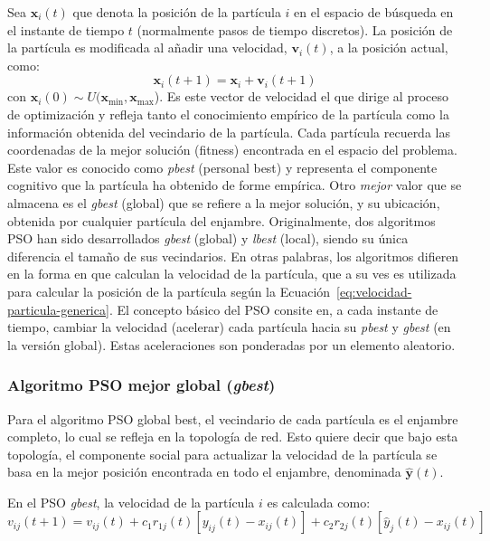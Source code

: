 \documentclass{article}
\begin{document}
Sea $\mathbf{x}_i(t)$ que denota la posición de la partícula $i$ en el espacio de búsqueda en el instante de tiempo $t$ (normalmente pasos de tiempo discretos).
La posición de la partícula es modificada al añadir una velocidad, $\mathbf{v}_i(t)$, a la posición actual, como:
\begin{equation}
	\mathbf{x}_i(t+1) = \mathbf{x}_i + \mathbf{v}_i(t+1)
	\label{eq:velocidad-particula-generica}
\end{equation}
con $\mathbf{x}_i(0) \sim U(\mathbf{x}_\text{min},\mathbf{x}_\text{max}$).
Es este vector de velocidad el que dirige al proceso de optimización y refleja tanto el conocimiento empírico de la partícula como la información obtenida del vecindario de la partícula.
Cada partícula recuerda las coordenadas de la mejor solución (fitness) encontrada en el espacio del problema. 
Este valor es conocido como \emph{pbest} (personal best) y representa el componente cognitivo que la partícula ha obtenido de forme empírica.
Otro \emph{mejor} valor que se almacena es el \emph{gbest} (global) que se refiere a la mejor solución, y su ubicación, obtenida por cualquier partícula del enjambre.
Originalmente, dos algoritmos PSO han sido desarrollados \emph{gbest} (global) y \emph{lbest} (local), siendo su única diferencia el tamaño de sus vecindarios.
En otras palabras, los algoritmos difieren en la forma en que calculan la velocidad de la partícula, que a su ves es utilizada para calcular la posición de la partícula según la Ecuación~\ref{eq:velocidad-particula-generica}.
El concepto básico del PSO consite en, a cada instante de tiempo, cambiar la velocidad (acelerar) cada partícula hacia su \emph{pbest} y \emph{gbest} (en la versión global).
Estas aceleraciones son ponderadas por un elemento aleatorio.


\subsubsection{Algoritmo PSO mejor global (\emph{gbest})}
Para el algoritmo PSO global best, el vecindario de cada partícula es el enjambre completo, lo cual se refleja en la topología de red.
Esto quiere decir que bajo esta topología, el componente social para actualizar la velocidad de la partícula se basa en la mejor posición encontrada en todo el enjambre, denominada $\mathbf{\hat{y}}(t)$.

En el PSO \emph{gbest}, la velocidad de la partícula $i$ es calculada como:
\begin{equation}
	v_{ij}(t+1) = v_{ij}(t) + c_1r_{1j}(t)[y_{ij}(t) - x_{ij}(t)] + c_2 r_{2j}(t)[\hat{y}_j(t) - x_{ij}(t)]
	\label{eq:velocidad-gbest}
\end{equation}
	
\end{document}
